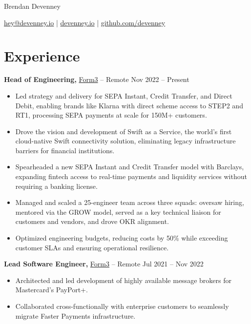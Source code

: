 \documentclass[11pt]{article}       %
\begin{document}
\centerline{\Huge Brendan Devenney}

\vspace{5pt}

\centerline{\href{mailto:hey@devenney.io}{hey@devenney.io} | \href{https://devenney.io}{devenney.io} | \href{https://github.com/devenney}{github.com/devenney}}

\vspace{-10pt}

\section*{Experience}

\textbf{Head of Engineering,} \href{https://form3.tech/}{Form3} -- Remote \hfill Nov 2022 -- Present \\
\vspace{-9pt}
\begin{itemize}
  \item Led strategy and delivery for SEPA Instant, Credit Transfer, and Direct Debit, enabling brands like Klarna\cite{klarna} with direct scheme access to STEP2 and RT1, processing SEPA payments at scale for 150M+ customers.
  \item Drove the vision and development of Swift as a Service\cite{swift}, the world's first cloud-native Swift connectivity solution, eliminating legacy infrastructure barriers for financial institutions.           
  \item Spearheaded a new SEPA Instant and Credit Transfer model with Barclays, expanding fintech access to real-time payments and liquidity services without requiring a banking license.  
  \item Managed and scaled a 25-engineer team across three squads: oversaw hiring, mentored via the GROW model, served as a key technical liaison for customers and vendors, and drove OKR alignment. 
  \item Optimized engineering budgets, reducing costs by 50\% while exceeding customer SLAs and ensuring operational resilience. \\
\end{itemize}

\textbf{Lead Software Engineer,} \href{https://form.tech/}{Form3} -- Remote \hfill Jul 2021 -- Nov 2022 \\
\vspace{-9pt}
\begin{itemize}
  \item Architected and led development of highly available message brokers for Mastercard’s PayPort+\cite{payport}.
  \item Collaborated cross-functionally with enterprise customers to seamlessly migrate Faster Payments infrastructure. \\
\end{itemize}
\end{document}
